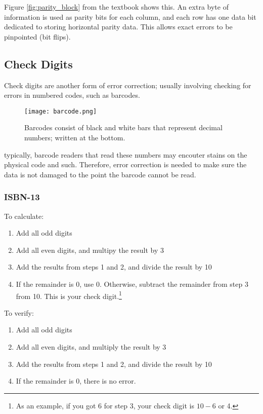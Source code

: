 \documentclass[../main.tex]{subfiles}
\begin{document}
Figure \ref{fig:parity_block} from the textbook shows this. An extra byte of information is used as parity bits for each column, and each row has one data bit dedicated to storing horizontal parity data. This allows exact errors to be pinpointed (bit flips).

\subsection{Check Digits}

Check digits are another form of error correction; usually involving checking for errors in numbered codes, such as barcodes.

\begin{figure}[h]
    \centering
    \texttt{[image: barcode.png]}
    \caption{Barcodes consist of black and white bars that represent decimal numbers; written at the bottom.}
    \label{fig:barcode}
\end{figure}

typically, barcode readers that read these numbers may encouter stains on the physical code and such. Therefore, error correction is needed to make sure the data is not damaged to the point the barcode cannot be read.

\subsubsection{ISBN-13}

To calculate:

\begin{enumerate}
    \item Add all odd digits
    \item Add all even digits, and multipy the result by 3
    \item Add the results from steps 1 and 2, and divide the result by 10
    \item If the remainder is 0, use 0. Otherwise, subtract the remainder from step 3 from 10. This is your check digit.\footnote{As an example, if you got 6 for step 3, your check digit is $10-6$ or 4.}
\end{enumerate}

To verify:

\begin{enumerate}
    \item Add all odd digits
    \item Add all even digits, and multiply the result by 3
    \item Add the results from steps 1 and 2, and divide the result by 10
    \item If the remainder is 0, there is no error.
\end{enumerate}
\end{document}
